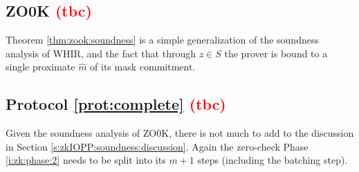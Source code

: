 \subsection{ZO0K \textcolor{red}{(tbc)}}
\label{s:IOPPsoundness:zook}

Theorem \ref{thm:zook:soundness} is a simple generalization of the soundness analysis of WHIR, and the fact that through $z\in S$ the prover is bound to a single proximate $\hat m$ of its mask commitment.




\subsection{Protocol \ref{prot:complete} \textcolor{red}{(tbc)}}
\label{s:IOPPsoundness:complete}

Given the soundness analysis of ZO0K, there is not much to add to the discussion in Section \ref{s:zkIOPP:soundness:discussion}.
Again the zero-check Phase \ref{i:zk:phase:2} needs to be split into its $m+1$ steps (including the batching step).